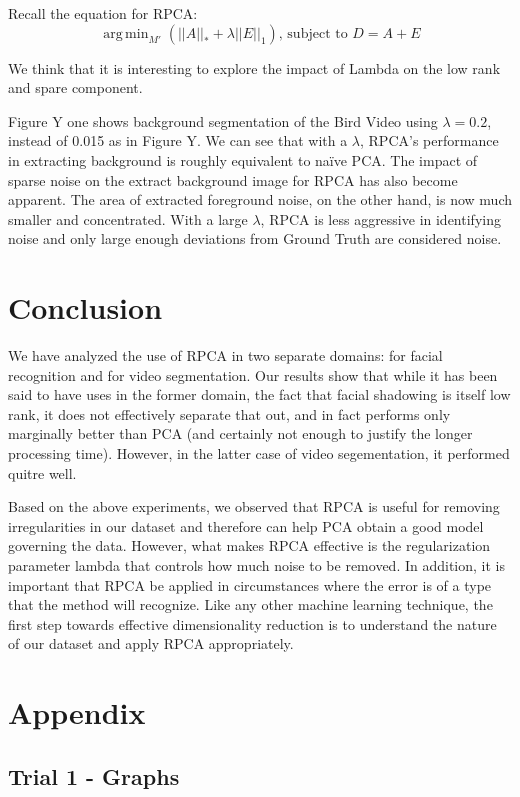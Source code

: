 \documentclass[11pt]{scrartcl} %
\DeclareMathOperator*{\argmin}{arg\,min}
\theoremstyle{plain}
\begin{document}
Recall the equation for RPCA:
\[ \argmin_{M'}(||A||_* + \lambda||E||_1) \text{,  subject to  }  D = A + E \]

We think that it is interesting to explore the impact of Lambda on the low rank and spare component. 

Figure Y one shows background segmentation of the Bird Video using $\lambda = 0.2$, instead of 0.015 as in Figure Y. We can see that with a $\lambda$, RPCA’s performance in extracting background is roughly equivalent to naïve PCA. The impact of sparse noise on the extract background image for RPCA has also become apparent. The area of extracted foreground noise, on the other hand, is now much smaller and concentrated. With a large $\lambda$, RPCA is less aggressive in identifying noise and only large enough deviations from Ground Truth are considered noise.

\section{Conclusion}

We have analyzed the use of RPCA in two separate domains: for facial recognition and for video segmentation. Our results show that while it has been said to have uses in the former domain, the fact that facial shadowing is itself low rank, it does not effectively separate that out, and in fact performs only marginally better than PCA (and certainly not enough to justify the longer processing time). However, in the latter case of video segementation, it performed quitre well.

Based on the above experiments, we observed that RPCA is useful for removing irregularities in our dataset and therefore can help PCA obtain a good model governing the data. However, what makes RPCA effective is the regularization parameter lambda that controls how much noise to be removed. In addition, it is important that RPCA be applied in circumstances where the error is of a type that the method will recognize. Like any other machine learning technique, the first step towards effective dimensionality reduction is to understand the nature of our dataset and apply RPCA appropriately.

\newpage

\section{Appendix}

\subsection{Trial 1 - Graphs}
\end{document}
